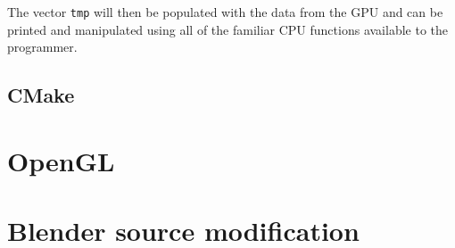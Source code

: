 The vector \verb|tmp| will then be populated with the data from the GPU and can
be printed and manipulated using all of the familiar CPU functions available to
the programmer. 

\subsection{CMake}

\section{OpenGL}
\section{Blender source modification}



